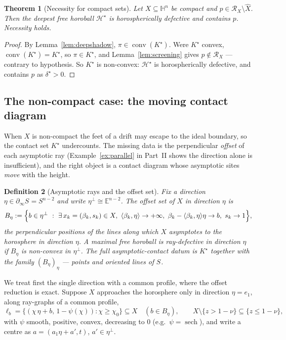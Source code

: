 \documentclass[11pt]{article}
\newtheorem{theorem}{Theorem}[section]
\newtheorem{definition}[theorem]{Definition}
\theoremstyle{remark}
\newcommand{\X}{X}
\newcommand{\Xhat}{\widehat{\X}}
\newcommand{\Rx}{\mathcal{R}_{\X}}
\newcommand{\Hb}[1]{\mathcal{H}_{#1}}
\newcommand{\Sb}[1]{S_{#1}}
\begin{document}
\begin{theorem}[Necessity for compact sets]\label{thm:kernelcompact}
Let $\X\subseteq\mathbb{H}^{n}$ be compact and $p\in\Rx\setminus\Xhat$.
Then the deepest free horoball $\Hb{}^{\star}$ is horospherically
defective and contains $p$. Necessity holds.
\end{theorem}

\begin{proof}
By Lemma~\ref{lem:deepshadow}, $\pi\in\operatorname{conv}(K^{\star})$.
Were $K^{\star}$ convex, $\operatorname{conv}(K^{\star})=K^{\star}$, so
$\pi\in K^{\star}$, and Lemma~\ref{lem:screening} gives $p\notin\Rx$
--- contrary to hypothesis. So $K^{\star}$ is non-convex:
$\Hb{}^{\star}$ is horospherically defective, and contains $p$ as
$\delta^{\star}>0$.
\end{proof}

\subsection{The non-compact case: the moving contact diagram}\label{sec:nec-noncompact}\label{sec:noncompact3}

When $\X$ is non-compact the feet of a drift may
escape to the ideal boundary, so the contact set $K^{\star}$ undercounts.
The missing data is the perpendicular \emph{offset} of each asymptotic
ray (Example~\ref{ex:parallel} in Part~II shows the direction alone is
insufficient), and the right object is a contact diagram whose asymptotic
sites \emph{move} with the height.

\begin{definition}[Asymptotic rays and the offset set]\label{def:asymray}
Fix a direction $\eta\in\partial_{\infty}\Sb{}=S^{n-2}$ and write
$\eta^{\perp}\cong\mathbb{E}^{n-2}$. The \emph{offset set} of $\X$ in
direction $\eta$ is
\[
B_{\eta}:=\Bigl\{b\in\eta^{\perp}\ :\ \exists\,x_{k}=(\beta_{k},s_{k})
\in\X,\ \langle\beta_{k},\eta\rangle\to+\infty,\ \beta_{k}-\langle
\beta_{k},\eta\rangle\eta\to b,\ s_{k}\to1\Bigr\},
\]
the perpendicular positions of the lines along which $\X$ asymptotes to
the horosphere in direction $\eta$. A maximal free horoball is
\emph{ray-defective in direction $\eta$} if $B_{\eta}$ is non-convex in
$\eta^{\perp}$. The full asymptotic-contact datum is $K^{\star}$
together with the family $(B_{\eta})_{\eta}$ --- points and oriented
lines of $\Sb{}$.
\end{definition}

We treat first the single direction with a common
profile, where the offset reduction is exact. Suppose $\X$ approaches the
horosphere only in direction $\eta=e_{1}$, along ray-graphs of a common
profile,
\[
\ell_{b}=\{(\chi\,\eta+b,\,1-\psi(\chi)):\chi\ge\chi_{0}\}\subseteq\X
\quad(b\in B_{\eta}),\qquad
\X\setminus\{z>1-\nu\}\subseteq\{z\le1-\nu\},
\]
with $\psi$ smooth, positive, convex, decreasing to $0$ (e.g.\
$\psi=\operatorname{sech}$), and write a centre as $a=(a_{1}\eta+a',t)$,
$a'\in\eta^{\perp}$.
\end{document}
